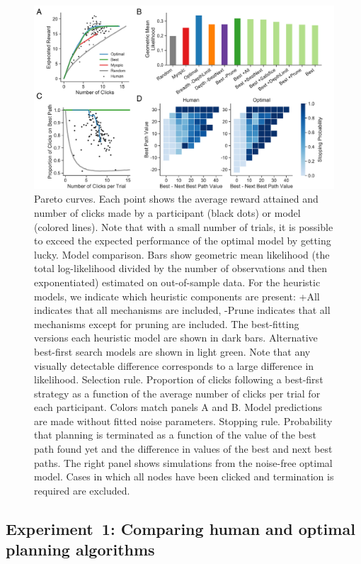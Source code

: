\begin{figure}[t!]
  \centering
  \includegraphics[width=\textwidth]{figs/planning/fig3.pdf}
  \caption{
     Pareto curves. Each point shows the average reward attained and number of clicks made by a participant (black dots) or model (colored lines). Note that with a small number of trials, it is possible to exceed the expected performance of the optimal model by getting lucky.
     Model comparison. Bars show geometric mean likelihood (the total log-likelihood divided by the number of observations and then exponentiated) estimated on out-of-sample data. For the heuristic models, we indicate which heuristic components are present: +All indicates that all mechanisms are included, -Prune indicates that all mechanisms except for pruning are included. The best-fitting versions each heuristic model are shown in dark bars. Alternative best-first search models are shown in light green. Note that any visually detectable difference corresponds to a large difference in likelihood.
     Selection rule. Proportion of clicks following a best-first strategy as a function of the average number of clicks per trial for each participant. Colors match panels A and B. Model predictions are made without fitted noise parameters.
     Stopping rule. Probability that planning is terminated as a function of the value of the best path found yet and the difference in values of the best and next best paths. The right panel shows simulations from the noise-free optimal model. Cases in which all nodes have been clicked and termination is required are excluded.
  }
  \label{fig:planning-exp1}
\end{figure}


\subsection{Experiment~1: Comparing human and optimal planning algorithms}\label{sec:planning-results1}

